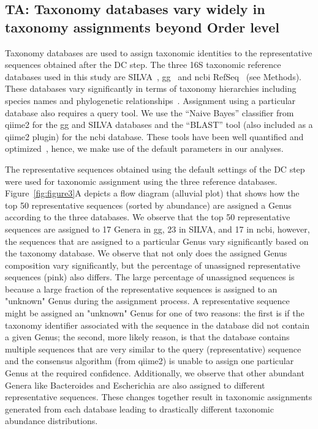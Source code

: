   \FloatBarrier

  \subsection*{TA: Taxonomy databases vary widely in taxonomy assignments beyond Order level}

  Taxonomy databases are used to assign taxonomic identities to the representative sequences obtained after the DC step.
  The three 16S taxonomic reference databases used in this study are SILVA~\cite{Quast2012}, \acs{gg}~\cite{DeSantis2006} and \acs{ncbi} RefSeq~\cite{Sayers2009} (see Methods).
  These databases vary significantly in terms of taxonomy hierarchies including species names and phylogenetic relationships~\cite{Balvociute2017}.
  Assignment using a particular database also requires a query tool.
  We use the ``Naive Bayes'' classifier from \ac{qiime2} for the \ac{gg} and SILVA databases and the ``BLAST'' tool (also included as a \ac{qiime2} plugin) for the \ac{ncbi} database.
  These tools have been well quantified and optimized~\cite{bokulichOptimizingTaxonomicClassification2018}, hence, we make use of the default parameters in our analyses.

  The representative sequences obtained using the default settings of the DC step were used for taxonomic assignment using the three reference databases.
  Figure~\ref{fig:figure3}A depicts a flow diagram (alluvial plot) that shows how the top 50 representative sequences (sorted by abundance) are assigned a Genus according to the three databases.
  We observe that the top 50 representative sequences are assigned to 17 Genera in \ac{gg}, 23 in SILVA, and 17 in \ac{ncbi}, however, the sequences that are assigned to a particular Genus vary significantly based on the taxonomy database.
  We observe that not only does the assigned Genus composition vary significantly, but the percentage of unassigned representative sequences (pink) also differs.
  The large percentage of unassigned sequences is because a large fraction of the representative sequences is assigned to an "unknown" Genus during the assignment process.
  A representative sequence might be assigned an "unknown" Genus for one of two reasons: the first is if the taxonomy identifier associated with the sequence in the database did not contain a given Genus; the second, more likely reason, is that the database contains multiple sequences that are very similar to the query (representative) sequence and the consensus algorithm (from \ac{qiime2}) is unable to assign one particular Genus at the required confidence.
  Additionally, we observe that other abundant Genera like Bacteroides and Escherichia are also assigned to different representative sequences.
  These changes together result in taxonomic assignments generated from each database leading to drastically different taxonomic abundance distributions.

